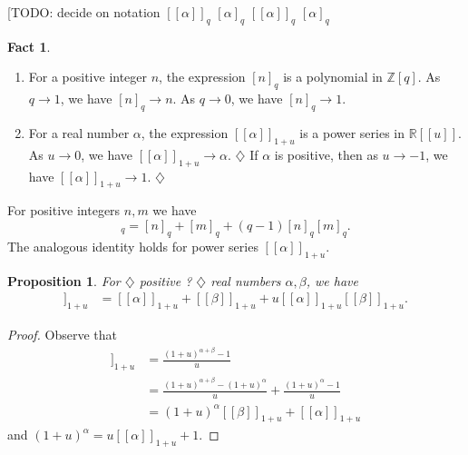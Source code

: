 \documentclass{amsart}
\newtheorem{prop}[thm]{Proposition}
\theoremstyle{definition}
\newtheorem{fact}[thm]{Fact}
\newcommand{\RR}{\mathbb{R}}
\newcommand{\ZZ}{\mathbb{Z}}
\newcommand{\fanalog}[2]{[\![#2]\!]_{#1}}
\newcommand{\analog}[2]{[#2]_{#1}}
\newcommand{\harry}[1]{{\color{red} \sf $\diamondsuit$  {#1} $\diamondsuit$ }}
\newcommand{\note}[1]{\harry{#1}}
\begin{document}
[TODO: decide on notation
$\fanalog{q}{\alpha}$
$\analog{q}{\alpha}$
$[\![\alpha]\!]_q$
$\left[\alpha\right]_q$

\begin{fact}
\hfill
\begin{enumerate}
\item 
For a positive integer $n$, the expression $\analog{q}{n}$ is a polynomial in $\ZZ[q]$. 
As $q \to 1$, we have $\analog{q}{n} \to n$.
As $q \to 0$, we have $\analog{q}{n} \to 1$.

\item 
For a real number $\alpha$, the expression $\fanalog{1 + u}{\alpha}$ is a power series in $\RR[[u]]$.
As $u \to 0$, we have $\fanalog{1 + u}{\alpha} \to \alpha$.
\note{If $\alpha$ is positive, then as $u \to -1$, we have $\fanalog{1 + u}{\alpha} \to 1$.}
\end{enumerate}
\end{fact}

For positive integers $n,m$ we have
\begin{equation*}
\analog{q}{n + m}
 = \analog{q}{n} + \analog{q}{m} + (q-1) \analog{q}{n} \analog{q}{m} .
\end{equation*}
The analogous identity holds for power series $\fanalog{1 + u}{\alpha}$.
\begin{prop}
For \note{positive ?} real numbers $\alpha,\beta$, we have
\begin{align*}
\fanalog{1 + u}{\alpha + \beta} 
 &= \fanalog{1 + u}{\alpha} + \fanalog{1 + u}{\beta} + u \fanalog{1 + u}{\alpha} \fanalog{1 + u}{\beta} .
\end{align*}
\end{prop}
\begin{proof}
Observe that
\begin{align*}
\fanalog{1 + u}{\alpha + \beta} &= \frac{(1+u)^{\alpha+\beta}-1}{u} \\
&= \frac{(1+u)^{\alpha+\beta}-(1+u)^\alpha}{u} + \frac{(1+u)^{\alpha}-1}{u} \\
&= (1+u)^\alpha \fanalog{1 + u}{\beta} + \fanalog{1 + u}{\alpha} 
\end{align*}
and
$
(1 + u)^\alpha 
= u \fanalog{1 + u}{\alpha} + 1 .
$
\end{proof}
\end{document}
